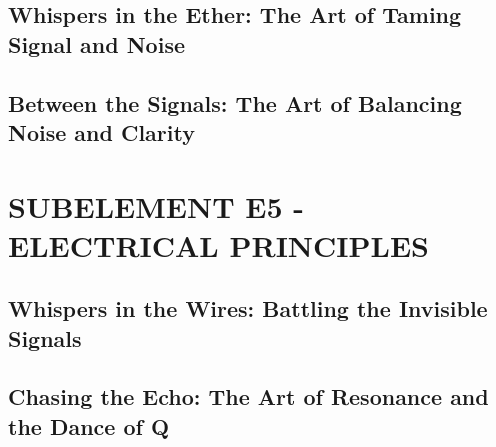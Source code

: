 \documentclass[12pt]{book}
\begin{document}
\section{Whispers in the Ether: The Art of Taming Signal and Noise}














\section{Between the Signals: The Art of Balancing Noise and Clarity}














\chapter{SUBELEMENT E5 - ELECTRICAL PRINCIPLES}
\section{Whispers in the Wires: Battling the Invisible Signals}














\section{Chasing the Echo: The Art of Resonance and the Dance of Q}













\end{document}
